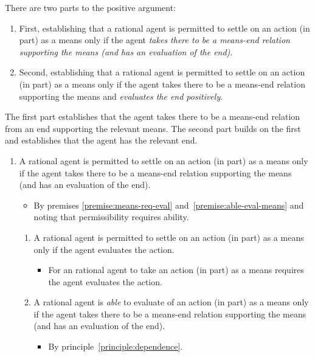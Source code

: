 \documentclass[10pt]{article}
\begin{document}
There are two parts to the positive argument:

\begin{enumerate}[label=\arabic*., ref=(\arabic*)]
\item First, establishing that a rational agent is permitted to settle on an action (in part) as a means only if the agent \emph{takes there to be a means-end relation supporting the means (and has an evaluation of the end)}.
\item Second, establishing that a rational agent is permitted to settle on an action (in part) as a means only if the agent takes there to be a means-end relation supporting the means and \emph{evaluates the end positively}.
\end{enumerate}
The first part establishes that the agent takes there to be a means-end relation from an end supporting the relevant means.
The second part builds on the first and establishes that the agent has the relevant end.

\begin{enumerate}[label=P\arabic*., ref=(P\arabic*)]
\item\label{premise:permit-eval-means} A rational agent is permitted to settle on an action (in part) as a means only if the agent takes there to be a means-end relation supporting the means (and has an evaluation of the end).
    \begin{itemize}
    \item By premises \ref{premise:means-req-eval} and~\ref{premise:able-eval-means} and noting that permissibility requires ability.
    \end{itemize}
  \begin{enumerate}[label=P\arabic{enumi}\alph*., ref=(P\arabic{enumi}\alph*)]
  \item\label{premise:means-req-eval} A rational agent is permitted to settle on an action (in part) as a means only if the agent evaluates the action.
    \begin{itemize}
    \item For an rational agent to take an action (in part) as a means requires the agent evaluates the action.
    \end{itemize}
  \item\label{premise:able-eval-means} A rational agent is \emph{able} to evaluate of an action (in part) as a means only if the agent takes there to be a means-end relation supporting the means (and has an evaluation of the end).
    \begin{itemize}
    \item By principle~\ref{principle:dependence}.
    \end{itemize}
  \end{enumerate}
\end{enumerate}
\end{document}

